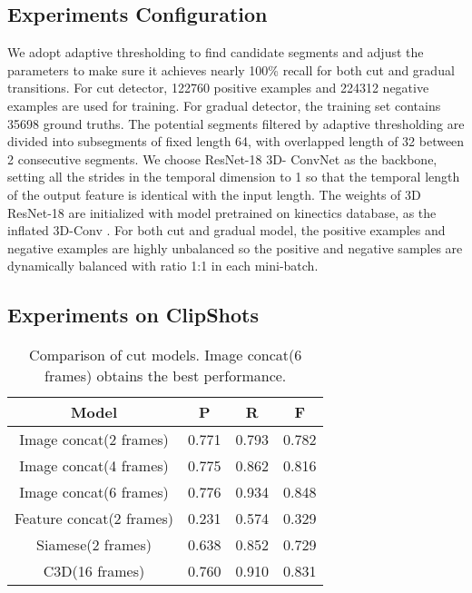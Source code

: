 \documentclass[runningheads]{llncs}
\begin{document}
\subsection{Experiments Configuration}
We adopt adaptive thresholding to find candidate segments and adjust the parameters to make sure it achieves nearly 100\% recall for both cut and gradual transitions. For cut detector, 122760 positive examples and 224312 negative examples are used for training. For gradual detector, the training set contains 35698 ground truths. The potential segments filtered by adaptive thresholding are divided into subsegments of fixed length 64, with overlapped length of 32 between 2 consecutive segments. We choose ResNet-18 3D- ConvNet as the backbone, setting all the strides in the temporal dimension to 1 so that the temporal length of the output feature is identical with the input length. The weights of 3D ResNet-18 are initialized with model pretrained on kinectics database, as the inflated 3D-Conv \cite{carreira2017quo}. For both cut and gradual model, the positive examples and negative examples are highly unbalanced so the positive and negative samples are dynamically balanced with ratio 1:1 in each mini-batch.

\subsection{Experiments on ClipShots}

\begin{table}
\centering
\begin{tabular} {c|c|c|c}
\hline Model&P&R&F\\
\hline Image concat(2 frames)&0.771&0.793&0.782\\ 
\hline Image concat(4 frames)&0.775&0.862&0.816\\ 
\hline Image concat(6 frames)&0.776&0.934&0.848\\ 
\hline Feature concat(2 frames)&0.231&0.574&0.329\\ 
\hline Siamese(2 frames)&0.638&0.852&0.729\\ 
\hline C3D(16 frames)&0.760&0.910&0.831\\
\hline
\end{tabular}
\caption[Comparison of cut models]{Comparison of cut models. Image concat(6 frames) obtains the best performance.}\label{table:1}
\end{table}
\end{document}
